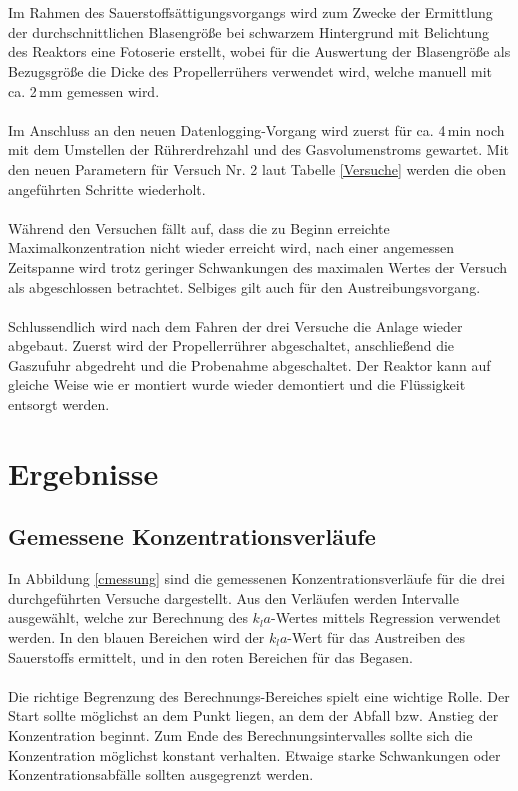 \documentclass[12pt,liststotoc]{report}
\begin{document}
\\
\\
Im Rahmen des Sauerstoffsättigungsvorgangs wird zum Zwecke der Ermittlung der durchschnittlichen Blasengröße bei schwarzem Hintergrund mit Belichtung des Reaktors eine Fotoserie erstellt, wobei für die Auswertung der Blasengröße als Bezugsgröße die Dicke des Propellerrühers verwendet wird, welche manuell mit ca. 2\,mm gemessen wird. 
\\
\\
Im Anschluss an den neuen Datenlogging-Vorgang wird zuerst für ca. 4\,min noch mit dem Umstellen der Rührerdrehzahl und des Gasvolumenstroms gewartet. Mit den neuen Parametern für Versuch Nr. 2 laut Tabelle \ref{Versuche} werden die oben angeführten Schritte wiederholt. 
\\
\\
Während den Versuchen fällt auf, dass die zu Beginn erreichte Maximalkonzentration nicht wieder erreicht wird, nach einer angemessen Zeitspanne wird trotz geringer Schwankungen des maximalen Wertes der Versuch als abgeschlossen betrachtet. Selbiges gilt auch für den Austreibungsvorgang. 
\\
\\
Schlussendlich wird nach dem Fahren der drei Versuche die Anlage wieder abgebaut. Zuerst wird der Propellerrührer abgeschaltet, anschließend die Gaszufuhr abgedreht und die Probenahme abgeschaltet. Der Reaktor kann auf gleiche Weise wie er montiert wurde wieder demontiert und die Flüssigkeit entsorgt werden.

\chapter{Ergebnisse}

\section{Gemessene Konzentrationsverläufe}

In Abbildung \ref{cmessung} sind die gemessenen Konzentrationsverläufe für die drei durchgeführten Versuche dargestellt. Aus den Verläufen werden Intervalle ausgewählt, welche zur Berechnung des $k_la$-Wertes mittels Regression verwendet werden. In den blauen Bereichen wird der $k_la$-Wert für das Austreiben des Sauerstoffs ermittelt, und in den roten Bereichen für das Begasen.\\
\\
Die richtige Begrenzung des Berechnungs-Bereiches spielt eine wichtige Rolle. Der Start sollte möglichst an dem Punkt liegen, an dem der Abfall bzw. Anstieg der Konzentration beginnt. Zum Ende des Berechnungsintervalles sollte sich die Konzentration möglichst konstant verhalten. Etwaige starke Schwankungen oder Konzentrationsabfälle sollten ausgegrenzt werden.
\end{document}
